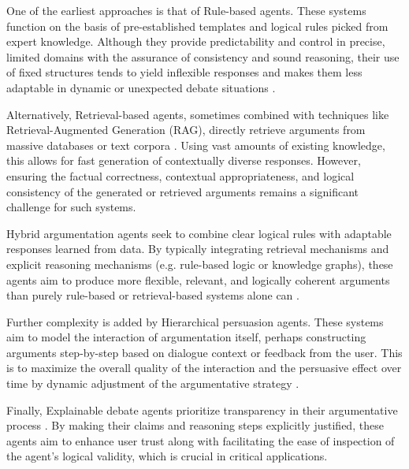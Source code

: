\documentclass[conference]{IEEEtran}
\begin{document}
One of the earliest approaches is that of Rule-based agents. These systems function on the basis of pre-established templates and logical rules picked from expert knowledge. Although they provide predictability and control in precise, limited domains with the assurance of consistency and sound reasoning, their use of fixed structures tends to yield inflexible responses and makes them less adaptable in dynamic or unexpected debate situations \cite{montealto2021rulebased}.

Alternatively, Retrieval-based agents, sometimes combined with techniques like Retrieval-Augmented Generation (RAG), directly retrieve arguments from massive databases or text corpora \cite{kulatska2019arguebot}. Using vast amounts of existing knowledge, this allows for fast generation of contextually diverse responses. However, ensuring the factual correctness, contextual appropriateness, and logical consistency of the generated or retrieved arguments remains a significant challenge for such systems.

Hybrid argumentation agents seek to combine clear logical rules with adaptable responses learned from data. By typically integrating retrieval mechanisms and explicit reasoning mechanisms (e.g. rule-based logic or knowledge graphs), these agents aim to produce more flexible, relevant, and logically coherent arguments than purely rule-based or retrieval-based systems alone can \cite{kulatska2019arguebot}.

Further complexity is added by Hierarchical persuasion agents. These systems aim to model the interaction of argumentation itself, perhaps constructing arguments step-by-step based on dialogue context or feedback from the user. This is to maximize the overall quality of the interaction and the persuasive effect over time by dynamic adjustment of the argumentative strategy \cite{sakai2020hierarchical}.

Finally, Explainable debate agents prioritize transparency in their argumentative process \cite{ali2022supportattack}. By making their claims and reasoning steps explicitly justified, these agents aim to enhance user trust along with facilitating the ease of inspection of the agent's logical validity, which is crucial in critical applications.
\end{document}
